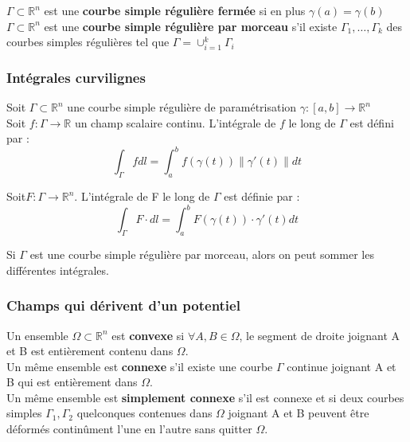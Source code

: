 \documentclass[../main.tex]{subfiles}
\begin{document}
$\Gamma \subset \mathbb{R}^n$ est une \textbf{courbe simple régulière fermée} si en plus $\gamma(a) = \gamma(b)$\\

$\Gamma \subset \mathbb{R}^n$ est une \textbf{courbe simple régulière par morceau} s'il existe $\Gamma_1, \dots, \Gamma_k$ des courbes simples régulières tel que $\Gamma = \cup_{i=1}^k \Gamma_i$\\

\subsubsection{Intégrales curvilignes}
Soit $\Gamma \subset \mathbb{R}^n$ une courbe simple régulière de paramétrisation $\gamma:[a,b] \rightarrow \mathbb{R}^n$\\

Soit $f : \Gamma \rightarrow \mathbb{R}$ un champ scalaire continu. L'intégrale de $f$ le long de $\Gamma$ est défini par :\\
\begin{equation}
    \int_{\Gamma} fdl = \int_a^b f(\gamma(t)) \parallel \gamma'(t) \parallel dt
\end{equation}

Soit$F : \Gamma \rightarrow \mathbb{R}^n$. L'intégrale de F le long de $\Gamma$ est définie par :\\
\begin{equation}
    \int_{\Gamma} F\cdot dl = \int_a^b F(\gamma(t)) \cdot \gamma'(t)dt
\end{equation}

Si $\Gamma$ est une courbe simple régulière par morceau, alors on peut sommer les différentes intégrales.\\

\subsubsection{Champs qui dérivent d'un potentiel}
Un ensemble $\Omega \subset \mathbb{R}^n$ est \textbf{convexe} si $\forall A, B \in \Omega$, le segment de droite joignant A et B est entièrement contenu dans $\Omega$.\\

Un même ensemble est \textbf{connexe} s'il existe une courbe $\Gamma$ continue joignant A et B qui est entièrement dans $\Omega$.\\

Un même ensemble est \textbf{simplement connexe} s'il est connexe et si deux courbes simples $\Gamma_1, \Gamma_2$ quelconques contenues dans $\Omega$ joignant A et B peuvent être déformés continûment l'une en l'autre sans quitter $\Omega$.
\end{document}
